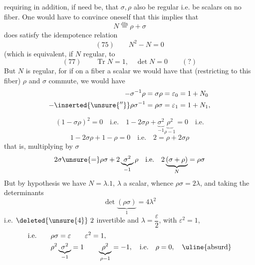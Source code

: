 requiring in addition, if need be, that $\sigma,\rho$ also be regular i.e. be scalars on no fiber. One would have to convince oneself that this implies that
\[
N\mathrel{\overset{\mathrm{dfn}}{=}}\rho+\sigma
\]
does satisfy the idempotence relation
\[
(75)\qquad N^2-N=0
\]
(which is equivalent, if $N$ regular, to
\[
(77)\qquad \operatorname{Tr}N=1,\quad\det N=0\qquad (?)
\]
But $N$ is regular, for if on a fiber  a scalar we would have that (restricting to this fiber) $\rho$ and $\sigma$ commute, we would have
\[
\begin{aligned}
-\sigma^{-1}\rho&=\sigma\rho=\varepsilon_0=1+N_0\\
-\inserted{\unsure{''}}\rho\sigma^{-1}&=\rho\sigma=\varepsilon_1=1+N_1,
\end{aligned}
\]

\[
(1-\sigma\rho)^2=0\quad\text{i.e.}\quad
1-2\sigma\rho+\underbrace{\sigma^2}_{-1}\underbrace{\rho^2}_{\rho-1}=0\quad\text{i.e.}
\]
\[
1-2\sigma\rho+1-\rho=0\quad\text{i.e.}\quad 2=\rho+2\sigma\rho
\]
that is, multiplying by $\sigma$
\[
2\sigma\unsure{=}\rho\sigma+2\underbrace{\sigma^2}_{-1}\rho
\quad\text{i.e.}\quad 2\underbrace{(\sigma+\rho)}_{N}=\rho\sigma
\]
But by hypothesis we have $N=\lambda.1$, $\lambda$ a scalar, whence $\rho\sigma=2\lambda$, and taking the determinants
\[
\det\underbrace{(\rho\sigma)}_{1}=4\lambda^2
\]
i.e. $\deleted{\unsure{4}}\ 2$ invertible and $\lambda=\dfrac{\varepsilon}{2}$, with $\varepsilon^2=1$,
\[
\begin{aligned}
\text{i.e.}\qquad&\rho\sigma=\varepsilon\qquad\varepsilon^2=1,\\
&\rho^2\underbrace{\sigma^2}_{-1}=1\qquad\underbrace{\rho^2}_{\rho-1}=-1,\quad\text{i.e.}\quad\rho=0,\quad\text{\uline{absurd}}
\end{aligned}
\]

